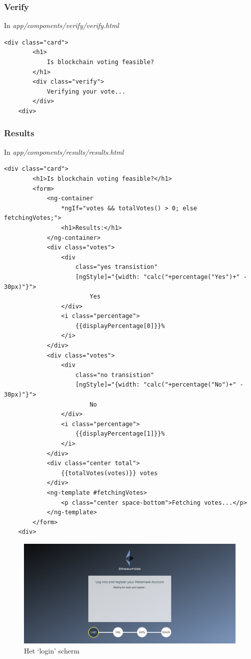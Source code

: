 	\subsubsection{Verify}
	In \textit{app/components/verify/verify.html}
	\lstset{language=HTML5}
	\begin{lstlisting}[frame=single]
	<div class="card">
		<h1>
			Is blockchain voting feasible?
		</h1>
		<div class="verify">
			Verifying your vote...
		</div>
	<div>
	\end{lstlisting}
	\subsubsection{Results}
	In \textit{app/components/results/results.html}
	\lstset{language=HTML5}
	\begin{lstlisting}[frame=single]
	<div class="card">
		<h1>Is blockchain voting feasible?</h1>
		<form>
			<ng-container 
				*ngIf="votes && totalVotes() > 0; else fetchingVotes;">
				<h1>Results:</h1>
			</ng-container>
			<div class="votes">
				<div 
					class="yes transistion" 
					[ngStyle]="{width: "calc("+percentage("Yes")+" - 30px)"}">
						Yes
				</div>
				<i class="percentage">
					{{displayPercentage[0]}}%
				</i>
			</div>
			<div class="votes">
				<div 
					class="no transistion" 
					[ngStyle]="{width: "calc("+percentage("No")+" - 30px)"}">
						No
				</div>
				<i class="percentage">
					{{displayPercentage[1]}}%
				</i>
			</div>
			<div class="center total">
				{{totalVotes(votes)}} votes
			</div>
			<ng-template #fetchingVotes>
				<p class="center space-bottom">Fetching votes...</p>
			</ng-template>
		</form>
	<div>
	\end{lstlisting}
	\newpage
		\begin{figure}[h!]
		\centering
		\includegraphics[width=\linewidth]{img/login.png}
		\caption{Het `login' scherm}
		\label{fig:login}
	\end{figure}
